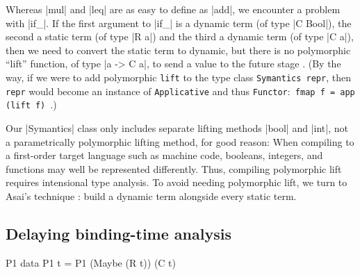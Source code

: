 \fi
Whereas |mul| and |leq| are as easy to define as |add|, we encounter
a problem with |if_|.  If the first argument to |if_| is a dynamic term
(of type |C Bool|), the second a static term (of type |R a|) and the third a
dynamic term (of type |C a|), then we need to convert
the static term to dynamic, but there is no polymorphic ``lift''
function, of type |a -> C a|, to send a value to the future stage
\cite{xi-guarded,WalidPOPL03}.\ifshort\else
(By the way, if we
were to add polymorphic \texttt{lift} to the type class
\texttt{Symantics repr}, then \texttt{repr} would become an instance of
\texttt{Applicative} and thus \texttt{Functor}:\texttt{ fmap
f = app (lift f)~}.)\fi

Our |Symantics| class only includes separate lifting methods |bool| and
|int|, not a parametrically polymorphic lifting method, for good reason:
When compiling to a first-order target language such as machine code,
booleans, integers, and functions may well be represented differently.
Thus, compiling polymorphic lift requires intensional type
analysis.  To avoid needing polymorphic lift, we turn to
Asai's technique \cite{asai-binding-time,sumii-hybrid}:
build a dynamic term
alongside every static term.

\subsection{Delaying binding-time analysis}
\label{S:PE-problem}

\begin{SaveVerbatim}{P1}
data P1 t = P1 (Maybe (R t)) (C t)
\end{SaveVerbatim}

